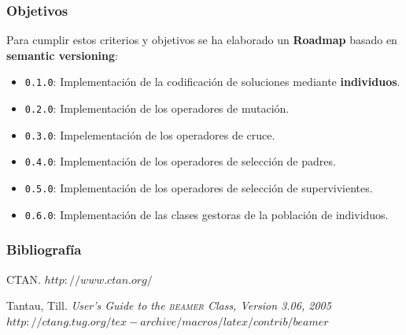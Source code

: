 \documentclass{beamer}
\newcommand{\beamer}{\textsc{beamer}}
\begin{document}
\begin{frame}
\frametitle{Objetivos}

Para cumplir estos criterios y objetivos se ha elaborado un \textbf{Roadmap} basado en \textbf{semantic versioning}:

\bigskip

\begin{itemize}
    \item \texttt{0.1.0}: Implementación de la codificación de soluciones mediante \textbf{individuos}.
    \item \texttt{0.2.0}: Implementación de los operadores de mutación.
    \item \texttt{0.3.0}: Impelementación de los operadores de cruce.
    \item \texttt{0.4.0}: Implementación de los operadores de selección de padres. 
    \item \texttt{0.5.0}: Implementación de los operadores de selección de supervivientes.
    \item \texttt{0.6.0}: Implementación de las clases gestoras de la población de individuos.
\end{itemize}

\end{frame}

\begin{frame}
  \frametitle{Bibliografía}

  \begin{thebibliography}{10}

    \beamertemplatebookbibitems
    CTAN. {\small $http://www.ctan.org/$}

    \beamertemplatebookbibitems
    Tantau, Till. 
    \emph{User's Guide to the \beamer{} Class, Version 3.06, 2005} 
    {\small $http://ctang.tug.org/tex-archive/macros/latex/contrib/beamer$}


  \end{thebibliography}
\end{frame}
\end{document}
